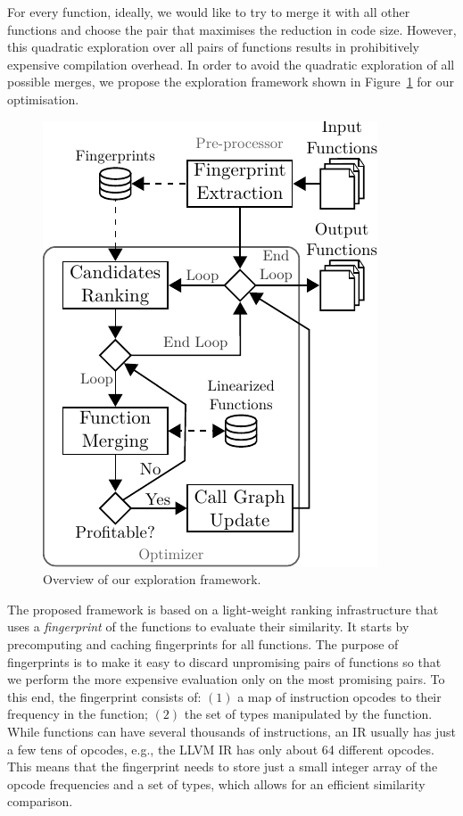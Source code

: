 For every function, ideally, we would like to try to merge it with all other functions and choose the pair that maximises the reduction in
code size. However, this quadratic exploration over all pairs of functions results in prohibitively expensive compilation
overhead. In order to avoid the quadratic exploration of all possible merges, we propose the exploration framework shown in
Figure~\ref{fig:func-merge-opt-arch} for our optimisation.
\begin{figure}[t!]
  \centering
  \includegraphics[width=0.7\linewidth]{src/merging-optimisation/figs/func-merge-opt-arch.pdf}
  \caption{Overview of our exploration framework.}
  \label{fig:func-merge-opt-arch}
\end{figure}

The proposed framework is based on a light-weight ranking infrastructure that uses a \textit{fingerprint} of the functions to evaluate
their similarity. It starts by precomputing and caching fingerprints for all functions. The purpose of fingerprints is to make it easy
to discard unpromising pairs of functions so that we perform the more expensive evaluation only on the most promising pairs.
To this end, the fingerprint consists of: $(1)$ a map of instruction opcodes to their frequency in the function; $(2)$ the set of types
manipulated by the function. While functions can have several thousands of instructions, an IR usually has just a few tens of opcodes,
e.g., the LLVM IR has only about 64 different opcodes. This means that the fingerprint needs to store just a small integer array of the
opcode frequencies and a set of types, which allows for an efficient similarity comparison.

